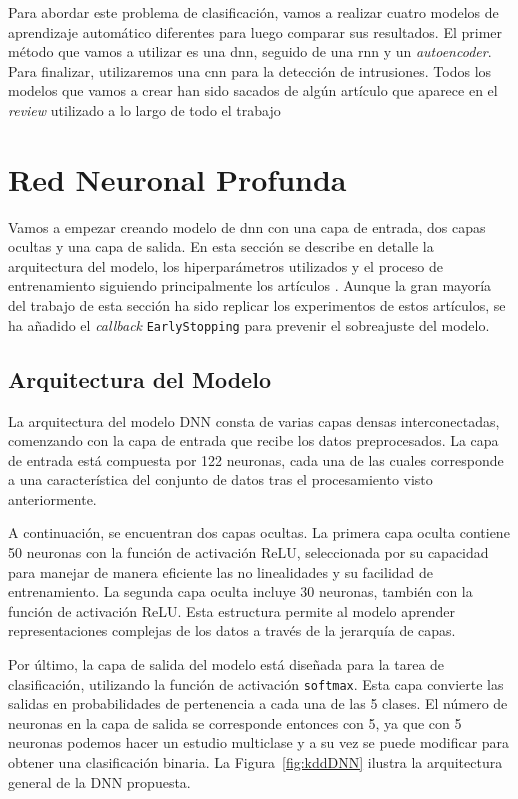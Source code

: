 Para abordar este problema de clasificación, vamos a realizar cuatro modelos de aprendizaje automático diferentes para luego comparar sus resultados. El primer método que vamos a utilizar es una \acrfull{dnn}, seguido de una \acrfull{rnn} y  un \textit{autoencoder}. Para finalizar, utilizaremos una \acrfull{cnn} para la detección de intrusiones. Todos los modelos que vamos a crear han sido sacados de algún artículo que aparece en el \textit{review} utilizado a lo largo de todo el trabajo \citep{podder2021artificial}







\section{Red Neuronal Profunda}

Vamos a empezar creando modelo de \acrfull{dnn} con una capa de entrada, dos capas ocultas y una capa de salida. En esta sección se describe en detalle la arquitectura del modelo, los hiperparámetros utilizados y el proceso de entrenamiento siguiendo principalmente los artículos \citep{maithem2021network, vigneswaran2018evaluating}. Aunque la gran mayoría del trabajo de esta sección ha sido replicar los experimentos de estos artículos, se ha añadido el \textit{callback }\lstinline|EarlyStopping| para prevenir el sobreajuste del modelo. 

\subsection{Arquitectura del Modelo}

La arquitectura del modelo DNN consta de varias capas densas interconectadas, comenzando con la capa de entrada que recibe los datos preprocesados. La capa de entrada está compuesta por 122 neuronas, cada una de las cuales corresponde a una característica del conjunto de datos tras el procesamiento visto anteriormente. 

A continuación, se encuentran dos capas ocultas. La primera capa oculta contiene 50 neuronas con la función de activación ReLU, seleccionada por su capacidad para manejar de manera eficiente las no linealidades y su facilidad de entrenamiento. La segunda capa oculta incluye 30 neuronas, también con la función de activación ReLU. Esta estructura permite al modelo aprender representaciones complejas de los datos a través de la jerarquía de capas. 

Por último, la capa de salida del modelo está diseñada para la tarea de clasificación, utilizando la función de activación \lstinline|softmax|. Esta capa convierte las salidas en probabilidades de pertenencia a cada una de las 5 clases. El número de neuronas en la capa de salida se corresponde entonces con 5, ya que con 5 neuronas podemos hacer un estudio multiclase y a su vez se puede modificar para obtener una clasificación binaria. La Figura~\ref{fig:kddDNN} ilustra la arquitectura general de la DNN propuesta.

